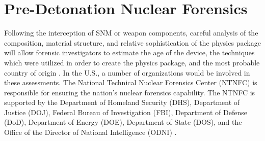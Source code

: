 \documentclass{report}
\begin{document}
% 
% 
% 
% 


\section{Pre-Detonation Nuclear Forensics}

Following the interception of SNM or weapon components, careful analysis of the composition, material structure, and relative sophistication of the physics package will allow forensic investigators to estimate the age of the device, the techniques which were utilized in order to create the physics package, and the most probable country of origin \cite{Glaser2008}. In the U.S., a number of organizations would be involved in these assessments. The National Technical Nuclear Forensics Center (NTNFC) is responsible for ensuring the nation's nuclear forensics capability.  The NTNFC is supported by the Department of Homeland Security (DHS), Department of Justice (DOJ), Federal Bureau of Investigation (FBI), Department of Defense (DoD), Department of Energy (DOE), Department of State (DOS), and the Office of the Director of National Intelligence (ODNI) \cite{DepartmentOfHomelandSecurit}. 
\end{document}
